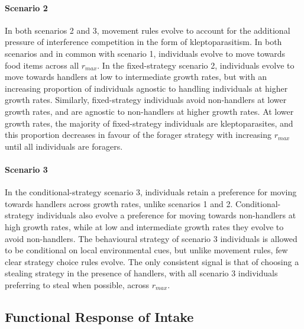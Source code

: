 \documentclass[11pt]{article}
\begin{document}
\paragraph{Scenario 2}

In both scenarios 2 and 3, movement rules evolve to account for the additional pressure of interference competition in the form of kleptoparasitism.
In both scenarios and in common with scenario 1, individuals evolve to move towards food items across all $r_{max}$.
In the fixed-strategy scenario 2, individuals evolve to move towards handlers at low to intermediate growth rates, but with an increasing proportion of individuals agnostic to handling individuals at higher growth rates.
Similarly, fixed-strategy individuals avoid non-handlers at lower growth rates, and are agnostic to non-handlers at higher growth rates.
At lower growth rates, the majority of fixed-strategy individuals are kleptoparasites, and this proportion decreases in favour of the forager strategy with increasing $r_{max}$ until all individuals are foragers.

\paragraph{Scenario 3}

In the conditional-strategy scenario 3, individuals retain a preference for moving towards handlers across growth rates, unlike scenarios 1 and 2.
Conditional-strategy individuals also evolve a preference for moving towards non-handlers at high growth rates, while at low and intermediate growth rates they evolve to avoid non-handlers.
The behavioural strategy of scenario 3 individuals is allowed to be conditional on local environmental cues, but unlike movement rules, few clear strategy choice rules evolve.
The only consistent signal is that of choosing a stealing strategy in the presence of handlers, with all scenario 3 individuals preferring to steal when possible, across $r_{max}$.

\subsection{Functional Response of Intake}
\end{document}
